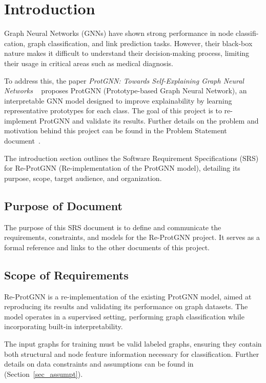 \documentclass[12pt]{article}
\begin{document}
\section{Introduction}

Graph Neural Networks (GNNs) have shown strong performance in node classifi-
cation, graph classification, and link prediction tasks. However, their black-box
nature makes it difficult to understand their decision-making process, limiting
their usage in critical areas such as medical diagnosis. 

To address this, the paper \textit{ProtGNN: Towards Self-Explaining Graph Neural Networks} ~\citep{zhang2022} proposes ProtGNN (Prototype-based Graph Neural Network), an interpretable GNN model designed to improve explainability by learning representative prototypes for each class. The goal of this project is to re-implement ProtGNN and validate its results. Further details on the problem and motivation behind this project can be found in the Problem Statement document~\citep{yuanqi2025protgnn}.

The introduction section outlines the Software Requirement Specifications (SRS) for Re-ProtGNN (Re-implementation of the ProtGNN model), detailing its purpose, scope, target audience, and organization.

\subsection{Purpose of Document}
The purpose of this SRS document is to define and communicate the requirements, constraints, and models for the Re-ProtGNN project. It serves as a formal reference and links to the other documents of this project.


\subsection{Scope of Requirements} 
Re-ProtGNN is a re-implementation of the existing ProtGNN model, aimed at reproducing its results and validating its performance on graph datasets. The model operates in a supervised setting, performing graph classification while incorporating built-in interpretability. 

The input graphs for training must be valid labeled graphs, ensuring they contain both structural and node feature information necessary for classification. Further details on data constraints and assumptions can be found in (Section~\ref{sec_assumpt}).
\end{document}

